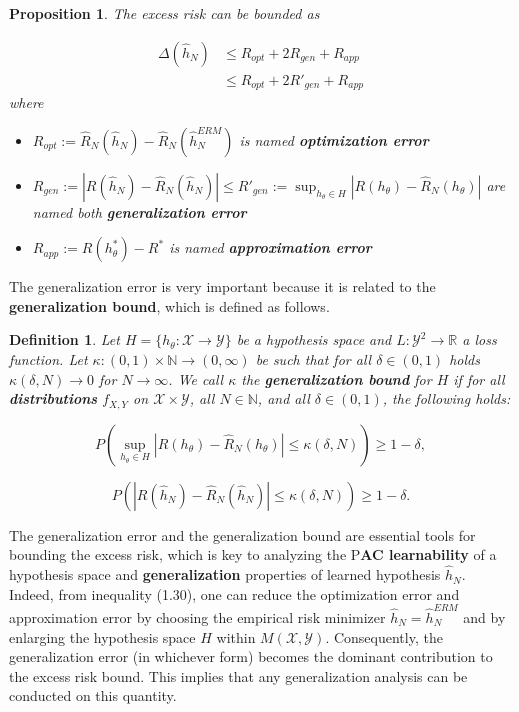 \documentclass{report}
\newtheorem{definition}{Definition}[chapter]
\newtheorem{proposition}{Proposition}[chapter]
\begin{document}
\begin{proposition}
The excess risk can be bounded as

\begin{equation}
\begin{split}
\Delta(\hat{h}_N) & \leq R_{opt} + 2R_{gen} + R_{app}\\
&\leq R_{opt} + 2R'_{gen} + R_{app}
\end{split}
\end{equation}
where

\begin{itemize}
\item $R_{opt} := \hat{R}_N(\hat{h}_N)-\hat{R}_N(\hat{h}^{ERM}_N)$ is named \textbf{optimization error}
\item $R_{gen} := |R(\hat{h}_N)-\hat{R}_N(\hat{h}_N)| \leq R'_{gen} := \sup_{h_{\theta} \in H}|R(h_\theta)-\hat{R}_N(h_\theta)|$ are named both \textbf{generalization error}
\item $R_{app} := R(h^*_\theta)-R^*$ is named \textbf{approximation error}
\end{itemize}
\end{proposition}
The generalization error is very important because it is related to the \textbf{generalization bound}, which is defined as follows.

\begin{definition}
Let $H = \{h_\theta : \mathcal{X} \to \mathcal{Y}\}$ be a hypothesis space and $L:\mathcal{Y}^2 \to \mathbb{R}$ a loss function. Let $\kappa : (0,1) \times \mathbb{N} \to (0,\infty)$ be such that for all $\delta \in (0,1)$ holds $\kappa(\delta, N) \to 0$ for $N \to \infty$. We call $\kappa$ the \textbf{generalization bound} for $H$ if for all \textbf{distributions} $f_{X,Y}$ on $\mathcal{X} \times \mathcal{Y}$, all $N \in \mathbb{N}$, and all $\delta \in (0,1)$, the following holds:

\begin{equation}
P\left(\sup_{h_{\theta} \in H}|R(h_\theta)-\hat{R}_N(h_\theta)|\leq \kappa(\delta, N)\right) \geq 1-\delta,
\end{equation}

\begin{equation}
P\left(|R(\hat{h}_N)-\hat{R}_N(\hat{h}_N)|\leq \kappa(\delta, N)\right) \geq 1-\delta.
\end{equation}
\end{definition}
The generalization error and the generalization bound are essential tools for bounding the excess risk, which is key to analyzing the P\textbf{AC learnability} of a hypothesis space and \textbf{generalization} properties of learned hypothesis $\hat{h}_N$. Indeed, from inequality (1.30), one can reduce the optimization error and approximation error by choosing the empirical risk minimizer $\hat{h}_N = \hat{h}^{ERM}_N$ and by enlarging the hypothesis space $H$ within $M(\mathcal{X}, \mathcal{Y})$. Consequently, the generalization error (in whichever form) becomes the dominant contribution to the excess risk bound. This implies that any generalization analysis can be conducted on this quantity.
\end{document}
